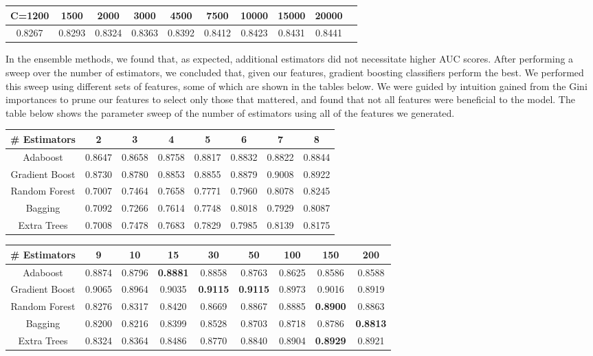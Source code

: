 \documentclass{article} %
\begin{document}
\begin{adjustbox}{width=\textwidth,totalheight=\textheight,keepaspectratio}
\begin{tabular}{cccccccccc}
C=1200 & 1500 & 2000 & 3000 & 4500 & 7500 & 10000 & 15000 & 20000\\
\hline
 0.8267 & 0.8293 & 0.8324 & 0.8363 & 0.8392 & 0.8412 & 0.8423 & 0.8431 & 0.8441
\end{tabular}
\end{adjustbox}

In the ensemble methods, we found that, as expected, additional estimators did
not necessitate higher AUC scores. After performing a sweep over the number of
estimators, we concluded that, given our features, gradient boosting classifiers
perform the best. We performed this sweep using different sets of features, some
of which are shown in the tables below. We were guided by intuition gained from the Gini
importances to prune our features to select only those that mattered, and found
that not all features were beneficial to the model. The table below shows the
parameter sweep of the number of estimators using
all of the features we generated.

\begin{adjustbox}{width=\textwidth,totalheight=\textheight,keepaspectratio}
\begin{tabular}{c | c c c c c c c}
\# Estimators & 2 & 3 & 4 & 5 & 6 & 7 & 8\\
\hline
Adaboost & 0.8647 & 0.8658 & 0.8758 & 0.8817 & 0.8832 & 0.8822 & 0.8844\\
Gradient Boost & 0.8730 & 0.8780 & 0.8853 & 0.8855 & 0.8879 & 0.9008 & 0.8922\\
Random Forest & 0.7007 & 0.7464 & 0.7658 & 0.7771 & 0.7960 & 0.8078 & 0.8245\\
Bagging & 0.7092 & 0.7266 & 0.7614 & 0.7748 & 0.8018 & 0.7929 & 0.8087\\
Extra Trees & 0.7008 & 0.7478 & 0.7683 & 0.7829 & 0.7985 & 0.8139 & 0.8175\\
\end{tabular}
\end{adjustbox}

\begin{adjustbox}{width=\textwidth,totalheight=\textheight,keepaspectratio}
\begin{tabular}{c | c c c c c c c c }
\# Estimators & 9 & 10 & 15 & 30 & 50 & 100 & 150 & 200\\
\hline
Adaboost & 0.8874 & 0.8796 & \textbf{0.8881} & 0.8858 & 0.8763 & 0.8625 & 0.8586 & 0.8588\\
Gradient Boost & 0.9065 & 0.8964 & 0.9035 & \textbf{0.9115} & \textbf{0.9115} & 0.8973 & 0.9016 & 0.8919\\
Random Forest & 0.8276 & 0.8317 & 0.8420 & 0.8669 & 0.8867 & 0.8885 & \textbf{0.8900} & 0.8863\\
Bagging & 0.8200 & 0.8216 & 0.8399 & 0.8528 & 0.8703 & 0.8718 & 0.8786 & \textbf{0.8813}\\
Extra Trees & 0.8324 & 0.8364 & 0.8486 & 0.8770 & 0.8840 & 0.8904 & \textbf{0.8929} & 0.8921
\end{tabular}
\end{adjustbox}
\end{document}
